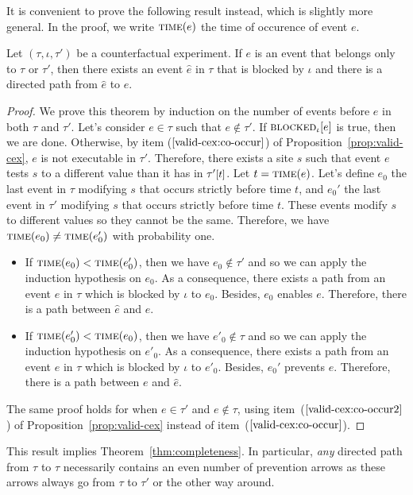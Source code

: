 It is convenient to prove the following result instead, which is
slightly more general. In the proof, we write $\textsc{time}(e)$ the time of
occurence of event $e$.
\begin{theorem*} Let $(\tau, \iota, \tau')$ be a counterfactual
  experiment. If $e$ is an event that belongs only to $\tau$
  or $\tau'$, then there exists an event $\hat e$ in
  $\tau$ that is blocked by $\iota$ and there is a directed path 
  from $\hat e$ to $e$.
\end{theorem*}
\begin{proof}
  We prove this theorem by induction on the number of events before
  $e$ in both $\tau$ and $\tau'$. Let's consider $e \in \tau$ such
  that $e \notin \tau'$. If ${\textsc{blocked}}_{\iota}[e]$ is true, then we are
  done. Otherwise, by item ($\ref{valid-cex:co-occur}$) of
  Proposition~\ref{prop:valid-cex}, $e$ is not executable in
  $\tau'$. Therefore, there exists a site $s$ such that event $e$
  tests $s$ to a different value than it has in $\TSTATE{t}{\tau'}$.
  Let $t = \textsc{time}(e)$.  Let's define $e_0$ the last event in $\tau$
  modifying $s$ that occurs strictly before time $t$, and $e_0'$ the
  last event in $\tau'$ modifying $s$ that occurs strictly before time
  $t$. These events modify $s$ to different values so they cannot be
  the same. Therefore, we have $\textsc{time}(e_0) \neq \textsc{time}(e_0')$ with
  probability one.

  \begin{itemize}
  \item If $\textsc{time}(e_0) < \textsc{time}(e_0')$, then we have
    $e_0 \notin \tau'$ and so we can apply the induction hypothesis on
    $e_0$. As a consequence, there exists a path from an event
    $\hat e$ in $\tau$ which is blocked by $\iota$ to $e_0$. Besides,
    $e_0$ enables $e$. Therefore, there is a path between $\hat e$
    and $e$.
  \item If $\textsc{time}(e_0') < \textsc{time}(e_0)$, then we have
    $e'_0 \notin \tau$ and so we can apply the induction
    hypothesis on $e'_0$. As a consequence, there exists a path from
    an event $\hat e$ in $\tau$ which is blocked by $\iota$ to
    $e'_0$. Besides, $e_0'$ prevents $e$. Therefore, there is a path
    between $e$ and $\hat e$.
  \end{itemize}
  The same proof holds for when $e \in \tau'$ and $e \notin \tau$,
  using item~($\ref{valid-cex:co-occur2}$) of
  Proposition~\ref{prop:valid-cex} instead of
  item~($\ref{valid-cex:co-occur}$).
\end{proof}
This result implies Theorem~\ref{thm:completeness}. In particular,
\emph{any} directed path from $\tau$ to $\tau$ necessarily contains an
even number of prevention arrows as these arrows always go from
$\tau$ to $\tau'$ or the other way around.
